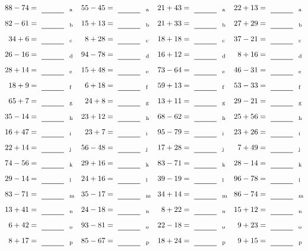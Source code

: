 \documentclass
[
  draft    = true,
  fontsize = 11pt,
  parskip  = half-
]
{scrartcl}
\begin{document}
\clearpage
\begin{align*}
    \pline{88-74}&=\rline{a}
  & \pline{55-45}&=\rline{a}
  & \pline{21+43}&=\rline{a}
  & \pline{22+13}&=\rline{a} \\[1ex]
    \pline{82-61}&=\rline{b}
  & \pline{15+13}&=\rline{b}
  & \pline{21+33}&=\rline{b}
  & \pline{27+29}&=\rline{b} \\[1ex]
    \pline{34+6}&=\rline{c}
  & \pline{8+28}&=\rline{c}
  & \pline{18+18}&=\rline{c}
  & \pline{37-21}&=\rline{c} \\[1ex]
    \pline{26-16}&=\rline{d}
  & \pline{94-78}&=\rline{d}
  & \pline{16+12}&=\rline{d}
  & \pline{8+16}&=\rline{d} \\[1ex]
    \pline{28+14}&=\rline{e}
  & \pline{15+48}&=\rline{e}
  & \pline{73-64}&=\rline{e}
  & \pline{46-31}&=\rline{e} \\[1ex]
    \pline{18+9}&=\rline{f}
  & \pline{6+18}&=\rline{f}
  & \pline{59+13}&=\rline{f}
  & \pline{53-33}&=\rline{f} \\[1ex]
    \pline{65+7}&=\rline{g}
  & \pline{24+8}&=\rline{g}
  & \pline{13+11}&=\rline{g}
  & \pline{29-21}&=\rline{g} \\[1ex]
    \pline{35-14}&=\rline{h}
  & \pline{23+12}&=\rline{h}
  & \pline{68-62}&=\rline{h}
  & \pline{25+56}&=\rline{h} \\[1ex]
    \pline{16+47}&=\rline{i}
  & \pline{23+7}&=\rline{i}
  & \pline{95-79}&=\rline{i}
  & \pline{23+26}&=\rline{i} \\[1ex]
    \pline{22+14}&=\rline{j}
  & \pline{56-48}&=\rline{j}
  & \pline{17+28}&=\rline{j}
  & \pline{7+49}&=\rline{j} \\[1ex]
    \pline{74-56}&=\rline{k}
  & \pline{29+16}&=\rline{k}
  & \pline{83-71}&=\rline{k}
  & \pline{28-14}&=\rline{k} \\[1ex]
    \pline{29-14}&=\rline{l}
  & \pline{24+16}&=\rline{l}
  & \pline{39-19}&=\rline{l}
  & \pline{96-78}&=\rline{l} \\[1ex]
    \pline{83-71}&=\rline{m}
  & \pline{35-17}&=\rline{m}
  & \pline{34+14}&=\rline{m}
  & \pline{86-74}&=\rline{m} \\[1ex]
    \pline{13+41}&=\rline{n}
  & \pline{24-18}&=\rline{n}
  & \pline{8+22}&=\rline{n}
  & \pline{15+12}&=\rline{n} \\[1ex]
    \pline{6+42}&=\rline{o}
  & \pline{93-81}&=\rline{o}
  & \pline{22-18}&=\rline{o}
  & \pline{9+23}&=\rline{o} \\[1ex]
    \pline{8+17}&=\rline{p}
  & \pline{85-67}&=\rline{p}
  & \pline{18+24}&=\rline{p}
  & \pline{9+15}&=\rline{p}
\end{align*}
\end{document}
